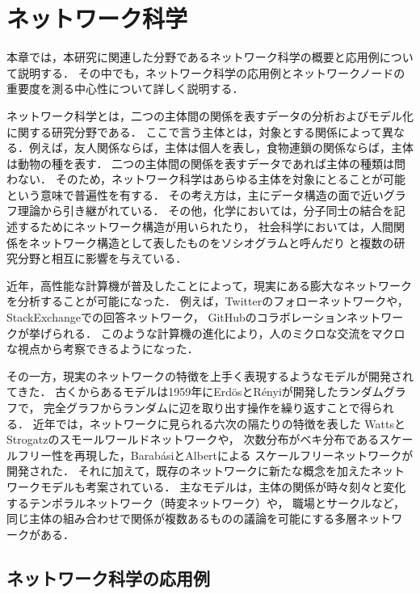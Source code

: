 \chapter{ネットワーク科学}
\label{chap:network-science}

本章では，本研究に関連した分野であるネットワーク科学の概要と応用例について説明する．
その中でも，ネットワーク科学の応用例とネットワークノードの重要度を測る中心性について詳しく説明する．

ネットワーク科学とは，二つの主体間の関係を表すデータの分析およびモデル化に関する研究分野である．
ここで言う主体とは，対象とする関係によって異なる．例えば，友人関係ならば，主体は個人を表し，食物連鎖の関係ならば，主体は動物の種を表す．
二つの主体間の関係を表すデータであれば主体の種類は問わない．
そのため，ネットワーク科学はあらゆる主体を対象にとることが可能という意味で普遍性を有する．
その考え方は，主にデータ構造の面で近いグラフ理論から引き継がれている．
その他，化学においては，分子同士の結合を記述するためにネットワーク構造が用いられたり\cite{Sylvester1878}，
社会科学においては，人間関係をネットワーク構造として表したものをソシオグラムと呼んだり\cite{Moreno1978}
と複数の研究分野と相互に影響を与えている．

近年，高性能な計算機が普及したことによって，現実にある膨大なネットワークを分析することが可能になった．
例えば，Twitterのフォローネットワーク\cite{Kwak2010}や，
StackExchangeでの回答ネットワーク\cite{Movshovitz-Attias2013}，
GitHubのコラボレーションネットワーク\cite{Lima2014}が挙げられる．
このような計算機の進化により，人のミクロな交流をマクロな視点から考察できるようになった．

その一方，現実のネットワークの特徴を上手く表現するようなモデルが開発されてきた．
古くからあるモデルは1959年にErd{\"{o}}sとR{\'{e}}nyiが開発したランダムグラフ\cite{Erdos1959}で，
完全グラフからランダムに辺を取り出す操作を繰り返すことで得られる．
近年では，ネットワークに見られる六次の隔たり\cite{Travers1969}の特徴を表した
WattsとStrogatzのスモールワールドネットワーク\cite{Watts1998}や，
次数分布がベキ分布であるスケールフリー性を再現した，Barab{\'{a}}siとAlbertによる
スケールフリーネットワーク\cite{Barabasi1999}が開発された．
それに加えて，既存のネットワークに新たな概念を加えたネットワークモデルも考案されている．
主なモデルは，主体の関係が時々刻々と変化するテンポラルネットワーク（時変ネットワーク）\cite{Holme2012}や，
職場とサークルなど，同じ主体の組み合わせで関係が複数あるものの議論を可能にする多層ネットワーク\cite{Kivela2014}がある．

\section{ネットワーク科学の応用例}

